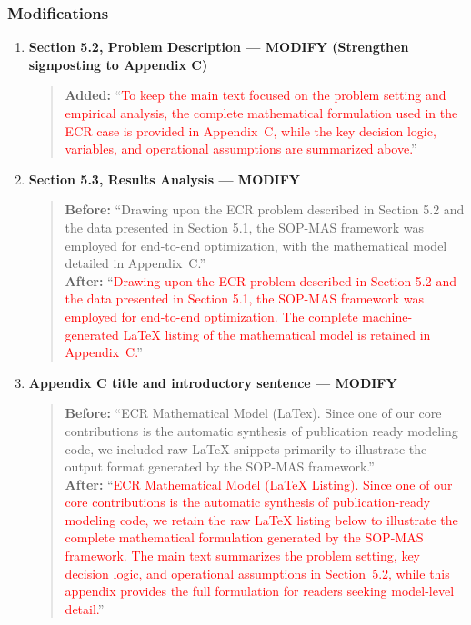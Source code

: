 \documentclass[11pt,a4paper]{article}
\begin{document}
\subsubsection{Modifications}
\begin{enumerate}
\item \textbf{Section 5.2, Problem Description --- MODIFY (Strengthen signposting to Appendix C)}
\begin{quote}
\textbf{Added:} ``\textcolor{red}{To keep the main text focused on the problem setting and empirical analysis, the complete mathematical formulation used in the ECR case is provided in Appendix~C, while the key decision logic, variables, and operational assumptions are summarized above.}''
\end{quote}

\item \textbf{Section 5.3, Results Analysis --- MODIFY}
\begin{quote}
\textbf{Before:} ``Drawing upon the ECR problem described in Section 5.2 and the data presented in Section 5.1, the SOP-MAS framework was employed for end-to-end optimization, with the mathematical model detailed in Appendix~C.''\\[4pt]
\textbf{After:} ``\textcolor{red}{Drawing upon the ECR problem described in Section 5.2 and the data presented in Section 5.1, the SOP-MAS framework was employed for end-to-end optimization. The complete machine-generated LaTeX listing of the mathematical model is retained in Appendix~C.}''
\end{quote}

\item \textbf{Appendix C title and introductory sentence --- MODIFY}
\begin{quote}
\textbf{Before:} ``ECR Mathematical Model (LaTex). Since one of our core contributions is the automatic synthesis of publication ready modeling code, we included raw LaTeX snippets primarily to illustrate the output format generated by the SOP-MAS framework.''\\[4pt]
\textbf{After:} ``\textcolor{red}{ECR Mathematical Model (LaTeX Listing). Since one of our core contributions is the automatic synthesis of publication-ready modeling code, we retain the raw LaTeX listing below to illustrate the complete mathematical formulation generated by the SOP-MAS framework. The main text summarizes the problem setting, key decision logic, and operational assumptions in Section~5.2, while this appendix provides the full formulation for readers seeking model-level detail.}''
\end{quote}
\end{enumerate}
\end{document}

